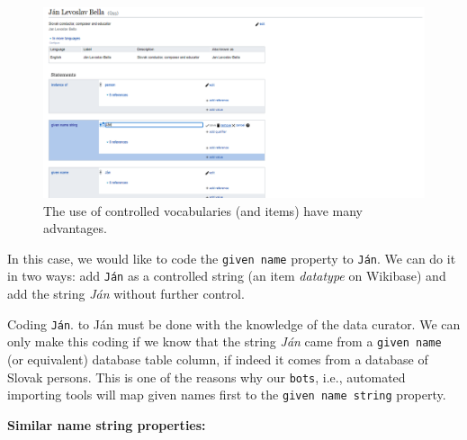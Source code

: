 \documentclass[
  letterpaper,
  DIV=11,
  numbers=noendperiod]{scrreprt}
\begin{document}
\begin{figure}[H]

{\centering \includegraphics{png/wikibase/edit/bella/bella_4.png}

}

\caption{The use of controlled vocabularies (and items) have many
advantages.}

\end{figure}%

In this case, we would like to code the \texttt{given\ name} property to
\texttt{Ján}. We can do it in two ways: add \texttt{Ján} as a controlled
string (an item \emph{datatype} on Wikibase) and add the string
\emph{Ján} without further control.

Coding \texttt{Ján}. to Ján must be done with the knowledge of the data
curator. We can only make this coding if we know that the string
\emph{Ján} came from a \texttt{given\ name} (or equivalent) database
table column, if indeed it comes from a database of Slovak persons. This
is one of the reasons why our \texttt{bots}, i.e., automated importing
tools will map given names first to the \texttt{given\ name\ string}
property.

\textbf{Similar name string properties:}
\end{document}
